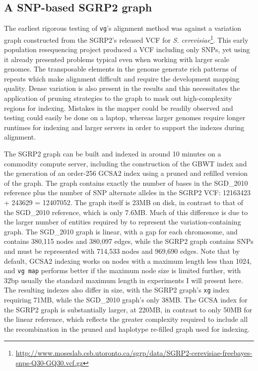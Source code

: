 \subsection{A SNP-based SGRP2 graph}
\label{sec:SGRP2_graph}
The earliest rigorous testing of {\tt vg}'s alignment method was against a variation graph constructed from the SGRP2's released VCF for \emph{S. cerevisiae}\footnote{\url{http://www.moseslab.csb.utoronto.ca/sgrp/data/SGRP2-cerevisiae-freebayes-snps-Q30-GQ30.vcf.gz}}.
This early population resequencing project produced a VCF including only SNPs, yet using it already presented problems typical even when working with larger scale genomes.
The transposable elements in the genome generate rich patterns of repeats which make alignment difficult and require the development mapping quality.
Dense variation is also present in the results and this necessitates the application of pruning strategies to the graph to mask out high-complexity regions for indexing.
Mistakes in the mapper could be readily observed and testing could easily be done on a laptop, whereas larger genomes require longer runtimes for indexing and larger servers in order to support the indexes during alignment.

The SGRP2 graph can be built and indexed in around 10 minutes on a commodity compute server, including the construction of the GBWT index and the generation of an order-256 GCSA2 index using a pruned and refilled version of the graph.
The graph contains exactly the number of bases in the SGD\_2010 reference plus the number of SNP alternate alleles in the SGRP2 VCF: 12163423 + 243629 = 12407052.
The graph itself is 23MB on disk, in contrast to that of the SGD\_2010 reference, which is only 7.6MB.
Much of this difference is due to the larger number of entities required by to represent the variation-containing graph.
The SGD\_2010 graph is linear, with a gap for each chromosome, and contains 380,115 nodes and 380,097 edges, while the SGRP2 graph contains SNPs and must be represented with 714,533 nodes and 969,690 edges.
Note that by default, GCSA2 indexing works on nodes with a maximum length less than 1024, and {\tt vg map} performs better if the maximum node size is limited further, with 32bp usually the standard maximum length in experiments I will present here.
The resulting indexes also differ in size, with the SGRP2 graph's {\tt xg} index requiring 71MB, while the SGD\_2010 graph's only 38MB.
The GCSA index for the SGRP2 graph is substantially larger, at 220MB, in contrast to only 50MB for the linear reference, which reflects the greater complexity required to include all the recombination in the pruned and haplotype re-filled graph used for indexing.

